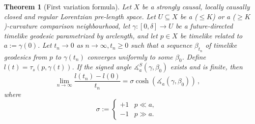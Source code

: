 \documentclass[11pt,reqno]{amsart}
\theoremstyle{definition}
\theoremstyle{definition}
\theoremstyle{plain}
\newtheorem{thm}[dfn]{Theorem}
\theoremstyle{remark}
\newcommand{\ma}{\measuredangle}
\begin{document}
\begin{thm}[First variation formula]
\label{fvf}
Let $X$ be a strongly causal, locally causally closed and regular Lorentzian pre-length space. Let $U\subseteq X$ be a ($\leq K$) or a ($\geq K$)-curvature comparison neighbourhood, let $\gamma:[0,\delta]\to U$ be a future-directed timelike geodesic parametrized by arclength, and let $p\in X $ be timelike related to $a:=\gamma(0)$. 
Let $t_n \to 0$ as $n \to \infty, t_n \geq 0$ such that a sequence $\beta_{t_n}$ of timelike geodesics from $p$ to $\gamma(t_n)$ converges uniformly to some $\beta_0$. 
Define $l(t) = \tau_s(p,\gamma(t))$. If the signed angle $\ma^S_a (\gamma,\beta_0)$ exists and is finite, then
\[ \lim_{n\to\infty}\frac{l(t_n)-l(0)}{t_n} = \sigma\cosh(\ma_a(\gamma,\beta_0)) \, ,\]
where 
\[\sigma:=\begin{cases}
+1 & p\ll a,\\
-1 & p\gg a.
\end{cases}\ \]
\end{thm}
\end{document}
